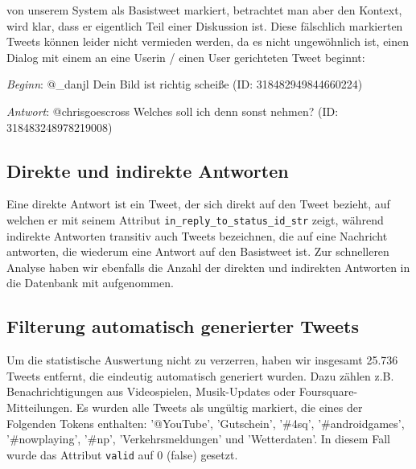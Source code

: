 \documentclass[main.tex]{subfiles}
\begin{document}
von unserem System als Basistweet markiert, betrachtet man aber den Kontext, wird klar, dass er eigentlich Teil einer Diskussion ist. 
Diese fälschlich markierten Tweets können leider nicht vermieden werden, da es nicht ungewöhnlich ist, einen Dialog mit einem an eine Userin / einen User gerichteten Tweet beginnt: 

\begin{example}
\textit{Beginn}:     @\_danjl Dein Bild ist richtig scheiße  (ID: 318482949844660224)

\textit{Antwort}:    @chrisgoescross Welches soll ich denn sonst nehmen? (ID: 318483248978219008)
\end{example} 


\subsection{Direkte und indirekte Antworten}
Eine direkte Antwort ist ein Tweet, der sich direkt auf den Tweet bezieht, auf welchen er mit seinem Attribut \texttt{in\_reply\_to\_status\_id\_str} zeigt, während indirekte Antworten transitiv auch Tweets bezeichnen, die auf eine Nachricht antworten, die wiederum eine Antwort auf den Basistweet ist. Zur schnelleren Analyse haben wir ebenfalls die Anzahl der direkten und indirekten Antworten in die Datenbank mit aufgenommen.

\subsection{Filterung automatisch generierter Tweets}
Um die statistische Auswertung nicht zu verzerren, haben wir insgesamt 25.736 Tweets entfernt, die eindeutig automatisch generiert wurden. Dazu zählen z.B. Benachrichtigungen aus Videospielen, Musik-Updates oder Foursquare-Mitteilungen. Es wurden alle Tweets als ungültig markiert, die eines der Folgenden Tokens enthalten: '@YouTube', 'Gutschein', '\#4sq', '\#androidgames', '\#nowplaying', '\#np', 'Verkehrsmeldungen' und 'Wetterdaten'. In diesem Fall wurde das Attribut \texttt{valid} auf 0 (false) gesetzt.
\end{document}
